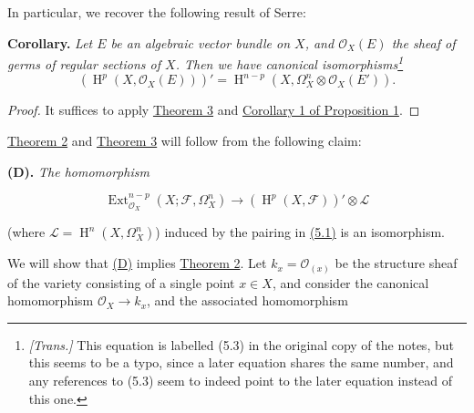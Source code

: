 \documentclass{article}
\newenvironment{itenv}[1]
  {\phantomsection\par\smallskip\noindent\textbf{#1.}\itshape}
  {\par\smallskip}
\newenvironment{eqenv}
  {}
  {}
\theoremstyle{definition}
\theoremstyle{definition}
\theoremstyle{definition}
\theoremstyle{definition}
\theoremstyle{remark}
\begin{document}
In particular, we recover the following result of Serre:

\leavevmode{}%
\begin{itenv}{Corollary}
Let \(E\) be an algebraic vector bundle on \(X\), and \({\mathscr{O}}_X(E)\) the sheaf of germs of regular sections of \(X\).
Then we have canonical isomorphisms\footnote{\emph{{[}Trans.{]}} This equation is labelled (5.3) in the original copy of the notes, but this seems to be a typo, since a later equation shares the same number, and any references to (5.3) seem to indeed point to the later equation instead of this one.}
\[
  (\operatorname{H}^p(X,{\mathscr{O}}_X(E)))' = \operatorname{H}^{n-p}(X,\Omega_X^n\otimes{\mathscr{O}}_X(E')).
\]

\end{itenv}

\begin{proof}
It suffices to apply \protect\hyperlink{fga-1-theorem-3}{Theorem 3} and \protect\hyperlink{fga-1-proposition-1-corollary-1}{Corollary 1 of Proposition 1}.
\end{proof}

\protect\hyperlink{fga-1-theorem-2}{Theorem 2} and \protect\hyperlink{fga-1-theorem-3}{Theorem 3} will follow from the following claim:

\leavevmode{}%
\begin{itenv}{(D)}
The homomorphism

\leavevmode{}%
\begin{eqenv}
\[
  \operatorname{Ext}_{{\mathscr{O}}_X}^{n-p}(X;{\mathscr{F}},\Omega_X^n) \to (\operatorname{H}^p(X,{\mathscr{F}}))'\otimes{\mathscr{L}}
\tag{5.2 bis}
\]

\end{eqenv}

(where \({\mathscr{L}}=\operatorname{H}^n(X,\Omega_X^n)\)) induced by the pairing in \protect\hyperlink{fga-1-equation-5.1}{(5.1)} is an isomorphism.

\end{itenv}

We will show that \protect\hyperlink{fga-1-D}{(D)} implies \protect\hyperlink{fga-1-theorem-2}{Theorem 2}.
Let \(k_x={\mathscr{O}}_{(x)}\) be the structure sheaf of the variety consisting of a single point \(x\in X\), and consider the canonical homomorphism \({\mathscr{O}}_X\to k_x\), and the associated homomorphism
\end{document}
